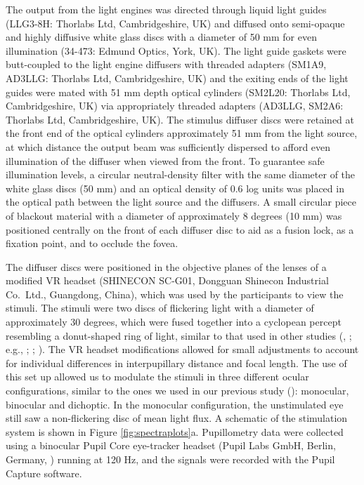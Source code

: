 \documentclass[
]{article}
\begin{document}
The output from the light engines was directed through liquid light guides (LLG3-8H: Thorlabs Ltd, Cambridgeshire, UK) and diffused onto semi-opaque and highly diffusive white glass discs with a diameter of 50 mm for even illumination (34-473: Edmund Optics, York, UK). The light guide gaskets were butt-coupled to the light engine diffusers with threaded adapters (SM1A9, AD3LLG: Thorlabs Ltd, Cambridgeshire, UK) and the exiting ends of the light guides were mated with 51 mm depth optical cylinders (SM2L20: Thorlabs Ltd, Cambridgeshire, UK) via appropriately threaded adapters (AD3LLG, SM2A6: Thorlabs Ltd, Cambridgeshire, UK). The stimulus diffuser discs were retained at the front end of the optical cylinders approximately 51 mm from the light source, at which distance the output beam was sufficiently dispersed to afford even illumination of the diffuser when viewed from the front. To guarantee safe illumination levels, a circular neutral-density filter with the same diameter of the white glass discs (50 mm) and an optical density of 0.6 log units was placed in the optical path between the light source and the diffusers. A small circular piece of blackout material with a diameter of approximately 8 degrees (10 mm) was positioned centrally on the front of each diffuser disc to aid as a fusion lock, as a fixation point, and to occlude the fovea.

The diffuser discs were positioned in the objective planes of the lenses of a modified VR headset (SHINECON SC-G01, Dongguan Shinecon Industrial Co.~Ltd., Guangdong, China), which was used by the participants to view the stimuli. The stimuli were two discs of flickering light with a diameter of approximately 30 degrees, which were fused together into a cyclopean percept resembling a donut-shaped ring of light, similar to that used in other studies (, ; e.g., ; ; ). The VR headset modifications allowed for small adjustments to account for individual differences in interpupillary distance and focal length. The use of this set up allowed us to modulate the stimuli in three different ocular configurations, similar to the ones we used in our previous study (): monocular, binocular and dichoptic. In the monocular configuration, the unstimulated eye still saw a non-flickering disc of mean light flux. A schematic of the stimulation system is shown in Figure \ref{fig:spectraplots}a. Pupillometry data were collected using a binocular Pupil Core eye-tracker headset (Pupil Labs GmbH, Berlin, Germany, ) running at 120 Hz, and the signals were recorded with the Pupil Capture software.
\end{document}
